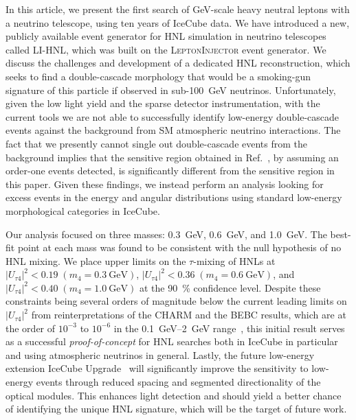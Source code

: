 \documentclass[
    aps,
    prd,
    reprint,
    amsmath,
    amssymb,
    nofootinbib,
    superscriptaddress,
    floatfix
]{revtex4-2}
\newcommand{\gev}{\giga\electronvolt}
\def\ut4{$|U_{\tau4}|^2$}
\def\nomathut4{|U_{\tau4}|^2}
\providecommand{\DIFaddtex}[1]{{\protect\color{blue}\uwave{#1}}} %
\providecommand{\DIFdeltex}[1]{{\protect\color{red}\sout{#1}}}                      %
\providecommand{\DIFaddbegin}{} %
\providecommand{\DIFaddend}{} %
\providecommand{\DIFdelbegin}{} %
\providecommand{\DIFdelend}{} %
\providecommand{\DIFadd}[1]{\texorpdfstring{\DIFaddtex{#1}}{#1}} %
\providecommand{\DIFdel}[1]{\texorpdfstring{\DIFdeltex{#1}}{}} %
\newcommand{\DIFscaledelfig}{0.5}
\newlength{\DIFdelgraphicswidth} %
\newlength{\DIFdelgraphicsheight} %
\newcommand{\DIFaddincludegraphics}[2][]{{\color{blue}\fbox{\DIFOincludegraphics[#1]{#2}}}} %
\newcommand{\DIFdelincludegraphics}[2][]{%
\sbox{\DIFdelgraphicsbox}{\DIFOincludegraphics[#1]{#2}}%
\settoboxwidth{\DIFdelgraphicswidth}{\DIFdelgraphicsbox} %
\settoboxtotalheight{\DIFdelgraphicsheight}{\DIFdelgraphicsbox} %
\scalebox{\DIFscaledelfig}{%
\parbox[b]{\DIFdelgraphicswidth}{\usebox{\DIFdelgraphicsbox}\\[-\baselineskip] \rule{\DIFdelgraphicswidth}{0em}}\llap{\resizebox{\DIFdelgraphicswidth}{\DIFdelgraphicsheight}{%
\setlength{\unitlength}{\DIFdelgraphicswidth}%
\begin{picture}(1,1)%
\thicklines\linethickness{2pt} %
{\color[rgb]{1,0,0}\put(0,0){\framebox(1,1){}}}%
{\color[rgb]{1,0,0}\put(0,0){\line( 1,1){1}}}%
{\color[rgb]{1,0,0}\put(0,1){\line(1,-1){1}}}%
\end{picture}%
}\hspace*{3pt}}} %
} %
\DeclareRobustCommand{\DIFaddbegin}{\DIFOaddbegin \let\includegraphics\DIFaddincludegraphics} %
\DeclareRobustCommand{\DIFaddend}{\DIFOaddend \let\includegraphics\DIFOincludegraphics} %
\DeclareRobustCommand{\DIFdelbegin}{\DIFOdelbegin \let\includegraphics\DIFdelincludegraphics} %
\DeclareRobustCommand{\DIFdelend}{\DIFOaddend \let\includegraphics\DIFOincludegraphics} %
\begin{document}
In this article, we present the first search of GeV-scale heavy neutral leptons with a neutrino telescope, using ten years of IceCube data.
We have introduced a new, publicly available event generator for HNL simulation in neutrino telescopes called \textsc{LI-HNL}, which was built on the \textsc{LeptonInjector} event generator.
We discuss the challenges and development of a dedicated HNL reconstruction, which seeks to find a double-cascade morphology that would be a smoking-gun signature of this particle if observed in sub-\SI{100}{\gev} neutrinos.
Unfortunately, given the low light yield and the sparse detector instrumentation, with the current tools we are not able to successfully identify low-energy double-cascade events against the background from SM atmospheric neutrino interactions.
The fact that we presently cannot single out double-cascade events from the background implies that the sensitive region obtained in Ref.~\cite{Coloma:2017ppo}, by assuming an order-one events detected, is significantly different from the sensitive region in this paper.
Given these findings, we instead perform an analysis looking for excess events in the energy and angular distributions using standard low-energy morphological categories in IceCube.

Our analysis focused on three masses: \SI{0.3}{\gev}, \SI{0.6}{\gev}, and \SI{1.0}{\gev}. 
The best-fit point at each mass was found to be consistent with the null hypothesis of no HNL mixing.
We place upper limits on the $\tau$-mixing of HNLs at \DIFdelbegin \DIFdel{$\nomathut4 < 0.19\;(m_4 = \SI{0.3}{\gev})$}\DIFdelend \DIFaddbegin \DIFadd{$\nomathut4 < 0.17\;(m_4 = \SI{0.3}{\gev})$}\DIFaddend , $\nomathut4 < 0.36\;(m_4 = \SI{0.6}{\gev})$, and \DIFdelbegin \DIFdel{$\nomathut4 < 0.40\;(m_4 = \SI{1.0}{\gev})$ }\DIFdelend \DIFaddbegin \DIFadd{$\nomathut4 < 0.44\;(m_4 = \SI{1.0}{\gev})$ }\DIFaddend at the \SI{90}{\percent} confidence level.
Despite these constraints being several orders of magnitude below the current leading limits on \ut4 from reinterpretations of the CHARM and the BEBC results, which are at the order of $10^{-3}$ to $10^{-6}$ in the \SIrange{0.1}{2}{\gev} range~\cite{Orloff:2002de, Boiarska:2021yho, Barouki:2022bkt}, this initial result serves as a successful \textit{proof-of-concept} for HNL searches both in IceCube in particular and using atmospheric neutrinos in general.
Lastly, the future low-energy extension IceCube Upgrade~\cite{Ishihara:2019aao} will significantly improve the sensitivity to low-energy events through reduced spacing and segmented directionality of the optical modules.
This enhances light detection and should yield a better chance of identifying the unique HNL signature, which will be the target of future work.
\end{document}

